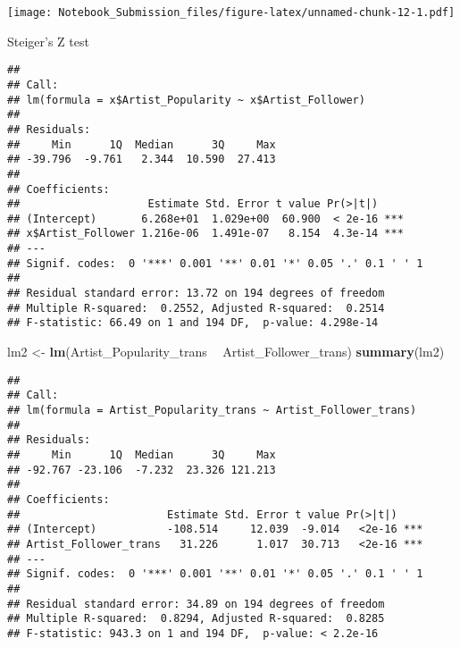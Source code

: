 \documentclass[
]{article}
\newenvironment{Shaded}{\begin{snugshade}}{\end{snugshade}}
\newcommand{\CommentTok}[1]{\textcolor[rgb]{0.56,0.35,0.01}{\textit{#1}}}
\newcommand{\KeywordTok}[1]{\textcolor[rgb]{0.13,0.29,0.53}{\textbf{#1}}}
\newcommand{\NormalTok}[1]{#1}
\newcommand{\OperatorTok}[1]{\textcolor[rgb]{0.81,0.36,0.00}{\textbf{#1}}}
\newcommand{\StringTok}[1]{\textcolor[rgb]{0.31,0.60,0.02}{#1}}
\begin{document}
\texttt{[image: Notebook\_Submission\_files/figure-latex/unnamed-chunk-12-1.pdf]}

Steiger's Z test

\begin{Shaded}
\end{Shaded}

\begin{verbatim}
## 
## Call:
## lm(formula = x$Artist_Popularity ~ x$Artist_Follower)
## 
## Residuals:
##     Min      1Q  Median      3Q     Max 
## -39.796  -9.761   2.344  10.590  27.413 
## 
## Coefficients:
##                    Estimate Std. Error t value Pr(>|t|)    
## (Intercept)       6.268e+01  1.029e+00  60.900  < 2e-16 ***
## x$Artist_Follower 1.216e-06  1.491e-07   8.154  4.3e-14 ***
## ---
## Signif. codes:  0 '***' 0.001 '**' 0.01 '*' 0.05 '.' 0.1 ' ' 1
## 
## Residual standard error: 13.72 on 194 degrees of freedom
## Multiple R-squared:  0.2552, Adjusted R-squared:  0.2514 
## F-statistic: 66.49 on 1 and 194 DF,  p-value: 4.298e-14
\end{verbatim}

\begin{Shaded}
\begin{Highlighting}[]
\NormalTok{lm2 <-}\StringTok{ }\KeywordTok{lm}\NormalTok{(Artist_Popularity_trans }\OperatorTok{~}\StringTok{ }\NormalTok{Artist_Follower_trans)}
\KeywordTok{summary}\NormalTok{(lm2)}
\end{Highlighting}
\end{Shaded}

\begin{verbatim}
## 
## Call:
## lm(formula = Artist_Popularity_trans ~ Artist_Follower_trans)
## 
## Residuals:
##     Min      1Q  Median      3Q     Max 
## -92.767 -23.106  -7.232  23.326 121.213 
## 
## Coefficients:
##                       Estimate Std. Error t value Pr(>|t|)    
## (Intercept)           -108.514     12.039  -9.014   <2e-16 ***
## Artist_Follower_trans   31.226      1.017  30.713   <2e-16 ***
## ---
## Signif. codes:  0 '***' 0.001 '**' 0.01 '*' 0.05 '.' 0.1 ' ' 1
## 
## Residual standard error: 34.89 on 194 degrees of freedom
## Multiple R-squared:  0.8294, Adjusted R-squared:  0.8285 
## F-statistic: 943.3 on 1 and 194 DF,  p-value: < 2.2e-16
\end{verbatim}
\end{document}
